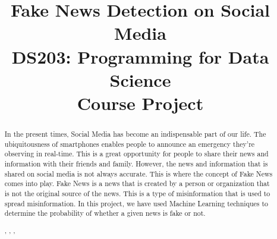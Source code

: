 \documentclass[conference]{IEEEtran}
\begin{document}
\title{Fake News Detection on Social Media\\
    \large DS203:  Programming for Data Science\\
    Course Project
}\\
\author{
}

\maketitle

\begin{abstract}

In the present times, Social Media has become an indispensable part of our life. The ubiquitousness of smartphones enables people to announce an emergency they’re observing in real-time. This is a great opportunity for people to share their news and information with their friends and family. However, the news and information that is shared on social media is not always accurate. This is where the concept of Fake News comes into play. Fake News is a news that is created by a person or organization that is not the original source of the news. This is a type of misinformation that is used to spread misinformation. In this project, we have used Machine Learning techniques to determine the probability of whether a given news is fake or not.

\begin{IEEEkeywords}
    , , , 
\end{IEEEkeywords}


\end{abstract}
\end{document}
